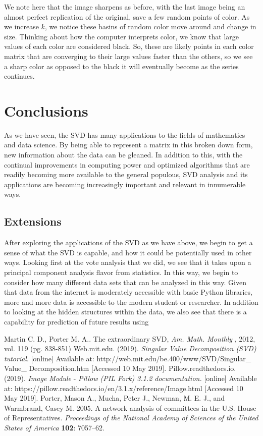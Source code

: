 \documentclass[letterpaper,12pt]{article}
\begin{document}
We note here that the image sharpens as before, with the last image being an almost perfect replication of the original, save a few random points of color. As we increase $k$, we notice these basins of random color move around and change in size. Thinking about how the computer interprets color, we know that large values of each color are considered black. So, these are likely points in each color matrix that are converging to their large values faster than the others, so we see a sharp color as opposed to the black it will eventually become as the series continues.
\section{Conclusions}
As we have seen, the SVD has many applications to the fields of mathematics and data science. By being able to represent a matrix in this broken down form, new information about the data can be gleaned. In addition to this, with the continual improvements in computing power and optimized algorithms that are readily becoming more available to the general populous, SVD analysis and its applications are becoming increasingly important and relevant in innumerable ways.
\subsection{Extensions}
After exploring the applications of the SVD as we have above, we begin to get a sense of what the SVD is capable, and how it could be potentially used in other ways. Looking first at the vote analysis that we did, we see that it takes upon a principal component analysis flavor from statistics. In this way, we begin to consider how many different data sets that can be analyzed in this way. Given that data from the internet is moderately accessible with basic Python libraries, more and more data is accessible to the modern student or researcher. In addition to looking at the hidden structures within the data, we also see that there is a capability for prediction of future results using 
\newpage
\begin{thebibliography}{9}
Martin C. D.,  Porter M. A.. The extraordinary SVD, \textit{Am. Math. Monthly} , 2012, vol. 119 (pg. 838-851)
Web.mit.edu. (2019). \textit{Singular Value Decomposition (SVD) tutorial}. [online] Available at: http://web.mit.edu/be.400/www/SVD/Singular\_ Value\_ Decomposition.htm [Accessed 10 May 2019].
Pillow.readthedocs.io. (2019). \textit{Image Module} - \textit{Pillow (PIL Fork) 3.1.2 documentation.} [online] Available at: https://pillow.readthedocs.io/en/3.1.x/reference/Image.html [Accessed 10 May 2019].
Porter, Mason A., Mucha, Peter J., Newman, M. E. J., and Warmbrand, Casey M. 2005. A network analysis of committees in the U.S. House of Representatives. \textit{Proceedings of the National Academy of Sciences of the United States of America} \textbf{102}: 7057–62.
\end{thebibliography}
\end{document}
